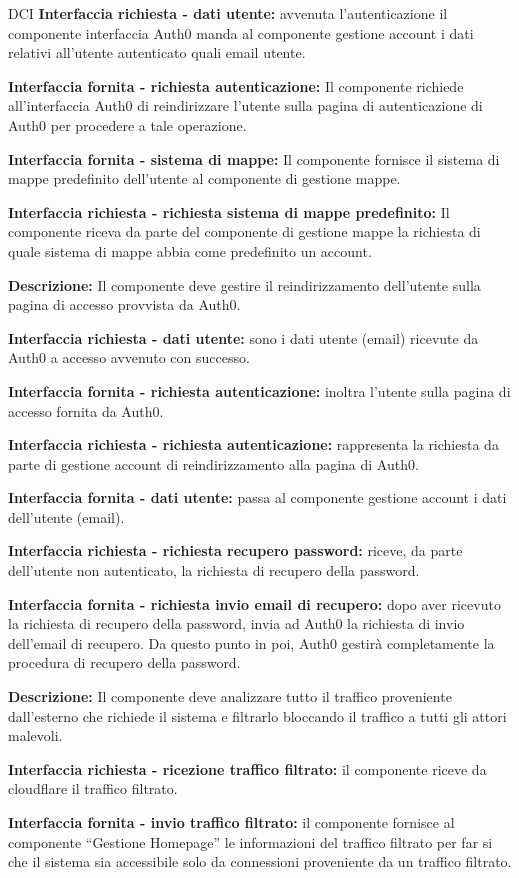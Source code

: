 \begin{listaPersonale}{DCI}
    \textbf{Interfaccia richiesta - dati utente:} avvenuta l'autenticazione il componente interfaccia Auth0 manda al componente gestione account i dati relativi all'utente autenticato quali email utente.

    \textbf{Interfaccia fornita - richiesta autenticazione:} Il componente richiede all'interfaccia Auth0 di reindirizzare l'utente sulla pagina di autenticazione di Auth0 per procedere a tale operazione.

    \textbf{Interfaccia fornita - sistema di mappe:} Il componente fornisce il sistema di mappe predefinito dell'utente al componente di gestione mappe.

    \textbf{Interfaccia richiesta - richiesta sistema di mappe predefinito:} Il componente riceva da parte del componente di gestione mappe la richiesta di quale sistema di mappe abbia come predefinito un account.



    \textbf{Descrizione:} Il componente deve gestire il reindirizzamento dell'utente sulla pagina di accesso provvista da Auth0.

    \textbf{Interfaccia richiesta - dati utente:} sono i dati utente (email) ricevute da Auth0 a accesso avvenuto con successo.

    \textbf{Interfaccia fornita - richiesta autenticazione:} inoltra l'utente sulla pagina di accesso fornita da Auth0.

    \textbf{Interfaccia richiesta - richiesta autenticazione:} rappresenta la richiesta da parte di gestione account di reindirizzamento alla pagina di Auth0.

    \textbf{Interfaccia fornita - dati utente:} passa al componente gestione account i dati dell'utente (email).

    \textbf{Interfaccia richiesta - richiesta recupero password:} riceve, da parte dell'utente non autenticato, la richiesta di recupero della password.

    \textbf{Interfaccia fornita - richiesta invio email di recupero:} dopo aver ricevuto la richiesta di recupero della password, invia ad Auth0 la richiesta di invio dell'email di recupero. Da questo punto in poi, Auth0 gestirà completamente la procedura di recupero della password.



    \textbf{Descrizione:} Il componente deve analizzare tutto il traffico proveniente dall'esterno che richiede il sistema e filtrarlo bloccando il traffico a tutti gli attori malevoli.

    \textbf{Interfaccia richiesta - ricezione traffico filtrato:} il componente riceve da cloudflare il traffico filtrato.

    \textbf{Interfaccia fornita - invio traffico filtrato:} il componente fornisce al componente “Gestione Homepage” le informazioni del traffico filtrato per far si che il sistema sia accessibile solo da connessioni proveniente da un traffico filtrato.

\end{listaPersonale}